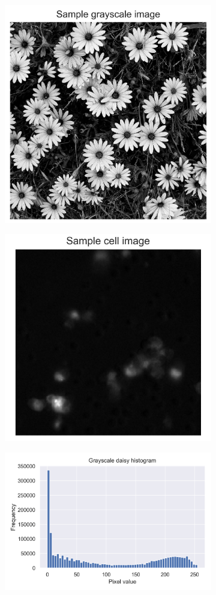 \begin{figure}[h]
    \centering
    \begin{subfigure}{0.45\textwidth}
        \centering
        \includegraphics[width=.5\textwidth]{dissertation/figures/sample_grayscale.jpg}
    \end{subfigure}
    \begin{subfigure}{0.45\textwidth}
        \centering
        \includegraphics[width=.5\textwidth]{dissertation/figures/sample_cell.jpg}
    \end{subfigure}
    \begin{subfigure}{0.45\textwidth}
        \centering
        \includegraphics[width=.5\textwidth]{dissertation/figures/grayscale_histogram.png}
    \end{subfigure}
    \begin{subfigure}{0.5\textwidth}

\end{subfigure}
\end{figure}

